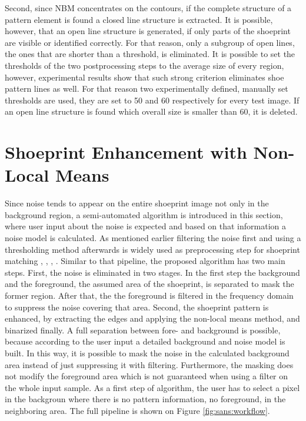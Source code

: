 \documentclass[draft,final]{vutinfth} %
\begin{document}
Second, since NBM concentrates on the contours, if the complete structure of a pattern element is found a closed line structure is extracted.
It is possible, however, that an open line structure is generated,  if only parts of the shoeprint are visible or identified correctly.
For that reason, only a subgroup of open lines, the ones that are shorter than a threshold, is eliminated.
It is possible to set the thresholds of the two postprocessing steps to the average size of every region, however, experimental results show that such strong criterion eliminates shoe pattern lines as well.
For that reason two experimentally defined, manually set thresholds are used, they are set to 50 and 60 respectively for every test image.
If an open line structure is found which overall size is smaller than 60, it is deleted.

\section{Shoeprint Enhancement with Non-Local Means}
\par
Since noise tends to appear on the entire shoeprint image not only in the background region, a semi-automated algorithm is introduced in this section, where user input about the noise is expected and based on that information a noise model is calculated.
As mentioned earlier filtering the noise first and using a thresholding method afterwards is widely used as preprocessing step for shoeprint matching \cite{alizadeh2017automatic}, \cite{wang2014automatic}, \cite{li2014retrieval}, \cite{kong2014novel}.
Similar to that pipeline, the proposed algorithm has two main steps.
First, the noise is eliminated in two stages.
In the first step the background and the foreground, the assumed area of the shoeprint, is separated to mask the former region.
After that, the the foreground is filtered in the frequency domain to suppress  the noise covering that area.
Second, the shoeprint pattern is enhanced, by extracting the edges and applying the non-local means method, and binarized finally.
A full separation between fore- and background is possible, because according to the user input a detailed background and noise model is built.
In this way, it is possible to mask the noise in the calculated background area instead of just suppressing it with filtering.
Furthermore, the masking does not modify the foreground area which is not guaranteed when using a filter on the whole input sample.
As a first step of algorithm, the user has to select a pixel in the backgroun where there is no pattern information, no foreground, in the neighboring area.
The full pipeline is shown on Figure \ref{fig:sans:workflow}.
\end{document}
